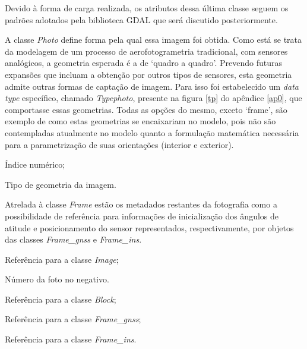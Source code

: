 Devido à forma de carga realizada, os atributos dessa última classe seguem os padrões adotados pela biblioteca GDAL que será discutido posteriormente.

A classe \textit{Photo} define forma pela qual essa imagem foi obtida. Como está se trata da modelagem de um processo de aerofotogrametria tradicional, com sensores analógicos, a geometria esperada é a de `quadro a quadro'. Prevendo futuras expansões que incluam a obtenção por outros tipos de sensores, esta geometria admite outras formas de captação de imagem. Para isso foi estabelecido um \textit{data type} específico, chamado \textit{Typephoto}, presente na figura \ref{tp} do apêndice \ref{ap0}, que comportasse essas geometrias. Todas as opções do mesmo, exceto `frame', são exemplo de como estas geometrias se encaixariam no modelo, pois não são contempladas atualmente no modelo quanto a formulação matemática necessária para a parametrização de suas orientações (interior e exterior).

\begin{description}[labelwidth=2cm, itemsep=-0.3cm]
\item [Classe Photo]
\item[Id:] Índice numérico;
\item[Geom\_t:] Tipo de geometria da imagem.
\end{description}

Atrelada à classe \textit{Frame} estão os metadados restantes da fotografia como a possibilidade de referência para informações de inicialização dos ângulos de atitude e posicionamento do sensor representados, respectivamente, por objetos das classes \textit{Frame\_gnss} e \textit{Frame\_ins}.

\begin{description}[labelwidth=2cm, itemsep=-0.3cm]
\item [Classe Frame]
\item[Id\_img:]  Referência para a classe \textit{Image};
\item[Num\_neg:] Número da foto no negativo.
\item[Id\_block:]  Referência para a classe \textit{Block};
\item[Id\_gnss:]  Referência para a classe \textit{Frame\_gnss};
\item[Id\_ins:]  Referência para a classe \textit{Frame\_ins}.
\end{description}

